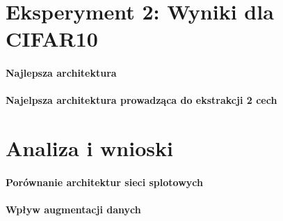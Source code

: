 \documentclass[10pt]{article}
\begin{document}
\pagebreak
\section{Eksperyment 2: Wyniki dla CIFAR10}\label{sec:ex2_cifar}

\paragraph{Najlepsza architektura}
\paragraph{Najelpsza architektura prowadząca do ekstrakcji 2 cech}

\pagebreak
\section{Analiza i wnioski}\label{sec:wyniki}

\paragraph{Porównanie architektur sieci splotowych}

\paragraph{Wpływ augmentacji danych}
\end{document}
